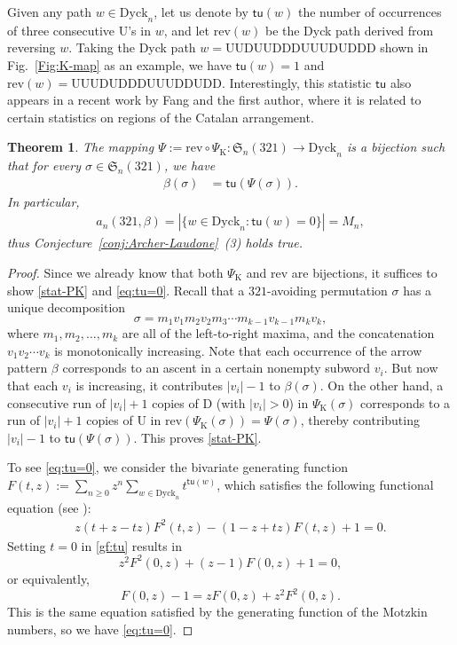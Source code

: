 \documentclass[12pt]{amsart}
\numberwithin{equation}{section}
\theoremstyle{plain}
\newtheorem{theorem}{Theorem}[section]
\def\fS{\mathfrak{S}}
\def\rU{\mathrm{U}}
\def\rD{\mathrm{D}}
\def\PK{\Psi_{\mathrm{K}}}
\def\Dyck{\mathrm{Dyck}}
\def\tu{\mathsf{tu}}
\def\rev{\mathrm{rev}}
\begin{document}
Given any path $w\in\Dyck_n$, let us denote by $\tu(w)$ the number of occurrences of three consecutive $\rU$'s in $w$, and let $\rev(w)$ be the Dyck path derived from reversing $w$. Taking the Dyck path $w=\rU\rU\rD\rU\rU\rD\rD\rD\rU\rU\rU\rD\rU\rD\rD\rD$ shown in Fig.~\ref{Fig:K-map} as an example, we have $\tu(w)=1$ and $\rev(w)=\rU\rU\rU\rD\rU\rD\rD\rD\rU\rU\rU\rD\rD\rU\rD\rD$. Interestingly, this statistic $\tu$ also appears in a recent work \cite{FF2026} by Fang and the first author, where it is related to certain statistics on regions of the Catalan arrangement.

\begin{theorem}\label{thm:beta-Kra}
The mapping $\Psi:=\rev\circ \PK:\fS_n(321)\to\Dyck_n$ is a bijection such that for every $\sigma\in\fS_n(321)$, we have
\begin{align}\label{stat-PK}
	\beta(\sigma) &= \tu(\Psi(\sigma)).
\end{align}
In particular,
\begin{align}\label{eq:tu=0}
	a_n(321,\beta)=|\{w\in\Dyck_n: \tu(w)=0\}|=M_n,
\end{align} 
thus Conjecture~\ref{conj:Archer-Laudone}~(3) holds true.
\end{theorem}
\begin{proof}
Since we already know that both $\PK$ and $\rev$ are bijections, it suffices to show \eqref{stat-PK} and \eqref{eq:tu=0}. Recall that a $321$-avoiding permutation $\sigma$ has a unique decomposition
$$\sigma = m_1v_1m_2v_2m_3\cdots m_{k-1}v_{k-1}m_kv_k,$$
where $m_1, m_2,\ldots, m_k$ are all of the left-to-right maxima, and the concatenation $v_1v_2\cdots v_k$ is monotonically increasing. Note that each occurrence of the arrow pattern $\beta$ corresponds to an ascent in a certain nonempty subword $v_i$. But now that each $v_i$ is increasing, it contributes $|v_i|-1$ to $\beta(\sigma)$. On the other hand, a consecutive run of $|v_i|+1$ copies of $\rD$ (with $|v_i|>0$) in $\PK(\sigma)$ corresponds to a run of $|v_i|+1$ copies of $\rU$ in $\rev(\PK(\sigma))=\Psi(\sigma)$, thereby contributing $|v_i|-1$ to $\tu(\Psi(\sigma))$. This proves \eqref{stat-PK}.

To see \eqref{eq:tu=0}, we consider the bivariate generating function $F(t,z):=\sum_{n\ge 0}z^n\sum_{w\in\Dyck_n}t^{\tu(w)}$, which satisfies the following functional equation (see \cite[A092107]{OEIS}):
\begin{align}\label{gf:tu}
	z(t+z-tz)F^2(t,z)-(1-z+tz)F(t,z)+1 = 0.
\end{align}
Setting $t=0$ in \eqref{gf:tu} results in 
$$z^2F^2(0,z)+(z-1)F(0,z)+1=0,$$
or equivalently,
$$F(0,z)-1 = zF(0,z)+z^2F^2(0,z).$$
This is the same equation satisfied by the generating function of the Motzkin numbers, so we have \eqref{eq:tu=0}.
\end{proof}
\end{document}
